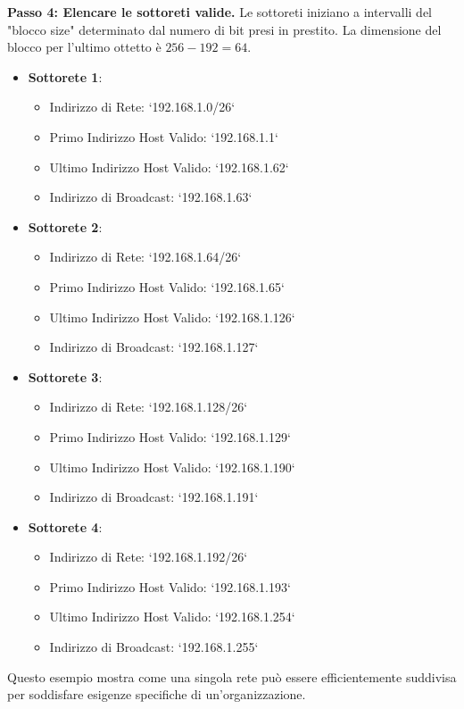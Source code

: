 \textbf{Passo 4: Elencare le sottoreti valide.}
Le sottoreti iniziano a intervalli del "blocco size" determinato dal numero di bit presi in prestito. La dimensione del blocco per l'ultimo ottetto è $256 - 192 = 64$.
\begin{itemize}
    \item \textbf{Sottorete 1}:
    \begin{itemize}
        \item Indirizzo di Rete: `192.168.1.0/26`
        \item Primo Indirizzo Host Valido: `192.168.1.1`
        \item Ultimo Indirizzo Host Valido: `192.168.1.62`
        \item Indirizzo di Broadcast: `192.168.1.63`
    \end{itemize}
    \item \textbf{Sottorete 2}:
    \begin{itemize}
        \item Indirizzo di Rete: `192.168.1.64/26`
        \item Primo Indirizzo Host Valido: `192.168.1.65`
        \item Ultimo Indirizzo Host Valido: `192.168.1.126`
        \item Indirizzo di Broadcast: `192.168.1.127`
    \end{itemize}
    \item \textbf{Sottorete 3}:
    \begin{itemize}
        \item Indirizzo di Rete: `192.168.1.128/26`
        \item Primo Indirizzo Host Valido: `192.168.1.129`
        \item Ultimo Indirizzo Host Valido: `192.168.1.190`
        \item Indirizzo di Broadcast: `192.168.1.191`
    \end{itemize}
    \item \textbf{Sottorete 4}:
    \begin{itemize}
        \item Indirizzo di Rete: `192.168.1.192/26`
        \item Primo Indirizzo Host Valido: `192.168.1.193`
        \item Ultimo Indirizzo Host Valido: `192.168.1.254`
        \item Indirizzo di Broadcast: `192.168.1.255`
    \end{itemize}
\end{itemize}
Questo esempio mostra come una singola rete può essere efficientemente suddivisa per soddisfare esigenze specifiche di un'organizzazione.